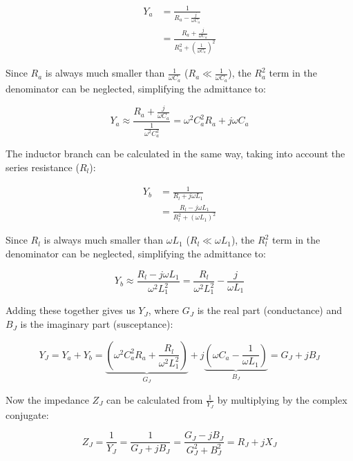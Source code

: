 \begin{align}
	Y_a &= \frac{1}{R_a - \frac{j}{\omega C_a}} \nonumber \\
	&= \frac{R_a + \frac{j}{\omega C_a}}{R_a^2 + \left(\frac{1}{\omega C_a}\right)^2}
\end{align}

Since $R_a$ is always much smaller than $\frac{1}{\omega C_a}$ ($R_a \ll \frac{1}{\omega C_a}$), the $R_a^2$ term in the denominator can be neglected, simplifying the admittance to:

\begin{equation}
	Y_a \approx \frac{R_a + \frac{j}{\omega C_a}}{\frac{1}{\omega^2 C_a^2}} = \omega^2 C_a^2 R_a + j\omega C_a
\end{equation}

The inductor branch can be calculated in the same way, taking into account the series resistance ($R_l$):

\begin{align}
	Y_b &= \frac{1}{R_l + j\omega L_1} \nonumber \\
	&= \frac{R_l - j\omega L_1}{R_l^2 + (\omega L_1)^2}
\end{align}

Since $R_l$ is always much smaller than $\omega L_1$ ($R_l \ll \omega L_1$), the $R_l^2$ term in the denominator can be neglected, simplifying the admittance to:

\begin{equation}
	Y_b \approx \frac{R_l - j\omega L_1}{\omega^2 L_1^2} = \frac{R_l}{\omega^2 L_1^2} - \frac{j}{\omega L_1}
\end{equation}

Adding these together gives us $Y_J$, where $G_J$ is the real part (conductance) and $B_J$ is the imaginary part (susceptance):

\begin{equation}
	Y_J = Y_a + Y_b = \underbrace{\left(\omega^2 C_a^2 R_a + \frac{R_l}{\omega^2 L_1^2}\right)}_{G_J} + j\underbrace{\left(\omega C_a - \frac{1}{\omega L_1}\right)}_{B_J} = G_J + jB_J
\end{equation}

Now the impedance $Z_J$ can be calculated from $\frac{1}{Y_J}$ by multiplying by the complex conjugate:

\begin{equation}
	Z_J = \frac{1}{Y_J} = \frac{1}{G_J + jB_J} = \frac{G_J - jB_J}{G_J^2 + B_J^2} = R_J + jX_J
\end{equation}

